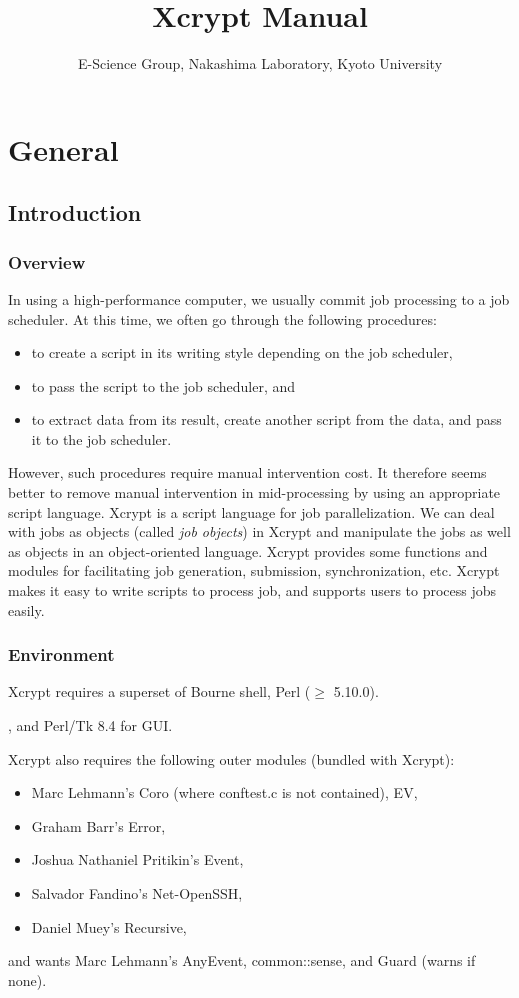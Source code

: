 \documentclass[a4paper,10pt]{report}
\title{Xcrypt Manual}
\author{E-Science Group, Nakashima Laboratory, Kyoto University}
\begin{document}
\maketitle
\tableofcontents

\part{General}
\chapter{Introduction}

\section{Overview}

In using a high-performance computer, we usually commit job processing
to a job scheduler.  At this time, we often go through the following
procedures:
\begin{itemize}
\item to create a script in its writing style depending on the
      job scheduler,
\item to pass the script to the job scheduler, and
\item to extract data from its result, create another script from
      the data, and pass it to the job scheduler.
\end{itemize}

However, such procedures require manual intervention cost.  It
therefore seems better to remove manual intervention in mid-processing
by using an appropriate script language.  Xcrypt is a script language
for job parallelization.  We can deal with jobs as objects (called
\textit{job objects}) in Xcrypt and manipulate the jobs as well as
objects in an object-oriented language.  Xcrypt provides some
functions and modules for facilitating job generation, submission,
synchronization, etc.  Xcrypt makes it easy to write scripts to process
job, and supports users to process jobs easily.

\section{Environment}

Xcrypt requires a superset of Bourne shell, Perl ($\geq$ 5.10.0).

, and Perl/Tk 8.4 for GUI.
\fi

Xcrypt also requires the following outer modules (bundled with Xcrypt):
\begin{itemize}
\item Marc Lehmann's Coro (where conftest.c is not contained), EV,
\item Graham Barr's Error,
\item Joshua Nathaniel Pritikin's Event,
\item Salvador Fandino's Net-OpenSSH,
\item Daniel Muey's Recursive,
\end{itemize}
and wants Marc Lehmann's AnyEvent, common::sense, and Guard (warns if
none).
\end{document}
